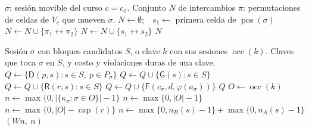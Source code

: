 \documentclass{article}
\newcommand{\clave}[1]{\mathsf{#1}}          %
\begin{document}
\begin{algorithm}[H]
\caption{$\textsc{Vecinos}(\sigma)$}
\label{alg:vecinos}
\begin{algorithmic}[1]
\Require $\sigma$: sesión movible del curso $c = c_\sigma$.
\Ensure Conjunto $N$ de intercambios $\pi$: permutaciones de celdas de $V_c$ que mueven $\sigma$.
\State $N \gets \emptyset$;\ \ $s_1 \gets$ primera celda de $\operatorname{pos}(\sigma)$
 
        \State $N \gets N \cup \{\pi_1 \leftrightarrow \pi_2\}$ 
    \EndFor
\EndIf
{} 
        \State $N \gets N \cup \{s_1 \leftrightarrow s_2\}$
    \EndFor
\EndIf
\State \Return $N$ 
\end{algorithmic}
\end{algorithm}

\begin{algorithm}[H]
\caption{Claves de restricción y costo de cada clave}
\label{alg:costo}
\begin{algorithmic}[1]
\Require Sesión $\sigma$ con bloques candidatos $S$, o clave $k$ con sus sesiones $\operatorname{occ}(k)$.
\Ensure Claves que toca $\sigma$ en $S$, y costo y violaciones duras de una clave.
 
    \State $Q \gets \{\clave{D}(p, s) : s \in S,\ p \in P_\sigma\}$
        \State $Q \gets Q \cup \{\clave{G}(s) : s \in S\}$
    \EndIf
        \State $Q \gets Q \cup \{\clave{R}(r, s) : s \in S\}$
    \EndIf
        \State $Q \gets Q \cup \{\clave{F}(c_\sigma, d, \varphi(a_\sigma))\}$ 
    \EndIf
    \State \Return $Q$
\EndFunction
\Statex
{} 
    \State $O \gets \operatorname{occ}(k)$
    \If{$k = \clave{D}(p, s)$}
        \State $n \gets \max\{0, |\{\kappa_\sigma : \sigma \in O\}| - 1\}$ 
    \ElsIf{$k = \clave{F}(c, d, f)$}
        \State $n \gets \max\{0, |O| - 1\}$
    \ElsIf{$k = \clave{R}(r, s)$}
        \State $n \gets \max\{0, |O| - \operatorname{cap}(r)\}$
    \Else \Comment{$k = \clave{G}(s)$}
        \State $n \gets \max\{0, n_B(s) - 1\} + \max\{0, n_A(s) - 1\}$ 
    \EndIf
    \State \Return $(W n,\ n)$
\EndFunction
\end{algorithmic}
\end{algorithm}
\end{document}

